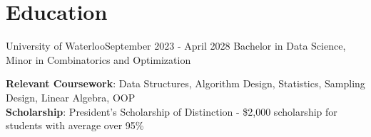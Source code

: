 \section{Education}
  \resumeSubHeadingListStart
    \resumeSubheading
      {University of Waterloo}{September 2023 - April 2028}
      {Bachelor in Data Science, Minor in Combinatorics and Optimization}{}
      
  \begin{itemize}[leftmargin=0.15in, label={}]
    \small{\item{
      	\textbf{Relevant Coursework}{: Data Structures, Algorithm Design, Statistics, Sampling Design, Linear Algebra, OOP} \\
      	\textbf{Scholarship}{: President's Scholarship of Distinction - \$2,000 scholarship for students with average over 95\%}
    }}
  \end{itemize}
  \resumeSubHeadingListEnd
